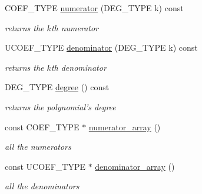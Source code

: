 \begin{Indent}
\begin{DoxyCompactItemize}
\mbox{\label{group__polygroup_a660686fcb8d2f6c874eea7ccb9ad127b}} 
C\+O\+E\+F\+\_\+\+T\+Y\+PE \hyperlink{group__polygroup_a660686fcb8d2f6c874eea7ccb9ad127b}{numerator} (D\+E\+G\+\_\+\+T\+Y\+PE k) const
\begin{DoxyCompactList}\small\item\em returns the $k$th numerator \end{DoxyCompactList}\item 
\mbox{\label{group__polygroup_a409c8de55599ce76d63a48d37a4dc41e}} 
U\+C\+O\+E\+F\+\_\+\+T\+Y\+PE \hyperlink{group__polygroup_a409c8de55599ce76d63a48d37a4dc41e}{denominator} (D\+E\+G\+\_\+\+T\+Y\+PE k) const
\begin{DoxyCompactList}\small\item\em returns the $k$th denominator \end{DoxyCompactList}\item 
\mbox{\label{group__polygroup_a12c3fe334fa0eefdc2533bad00df262d}} 
D\+E\+G\+\_\+\+T\+Y\+PE \hyperlink{group__polygroup_a12c3fe334fa0eefdc2533bad00df262d}{degree} () const
\begin{DoxyCompactList}\small\item\em returns the polynomial's degree \end{DoxyCompactList}\item 
\mbox{\label{group__polygroup_a72a983199fc30d9de996476e16fad6a9}} 
const C\+O\+E\+F\+\_\+\+T\+Y\+PE $\ast$ \hyperlink{group__polygroup_a72a983199fc30d9de996476e16fad6a9}{numerator\+\_\+array} ()
\begin{DoxyCompactList}\small\item\em all the numerators \end{DoxyCompactList}\item 
\mbox{\label{group__polygroup_a0337d2949c3c6826fd991d73f8593f5f}} 
const U\+C\+O\+E\+F\+\_\+\+T\+Y\+PE $\ast$ \hyperlink{group__polygroup_a0337d2949c3c6826fd991d73f8593f5f}{denominator\+\_\+array} ()
\begin{DoxyCompactList}\small\item\em all the denominators \end{DoxyCompactList}\end{DoxyCompactItemize}
\end{Indent}
